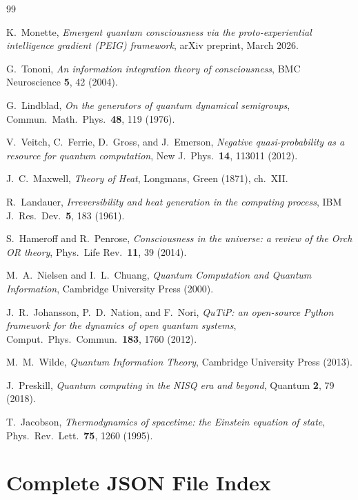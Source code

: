 \documentclass[12pt]{article}
\begin{document}
\begin{thebibliography}{99}

K.~Monette,
\textit{Emergent quantum consciousness via the proto-experiential intelligence
gradient (PEIG) framework},
arXiv preprint, March 2026.

G.~Tononi,
\textit{An information integration theory of consciousness},
BMC Neuroscience \textbf{5}, 42 (2004).

G.~Lindblad,
\textit{On the generators of quantum dynamical semigroups},
Commun.\ Math.\ Phys.\ \textbf{48}, 119 (1976).

V.~Veitch, C.~Ferrie, D.~Gross, and J.~Emerson,
\textit{Negative quasi-probability as a resource for quantum computation},
New J.\ Phys.\ \textbf{14}, 113011 (2012).

J.~C.~Maxwell,
\textit{Theory of Heat}, Longmans, Green (1871), ch.~XII.

R.~Landauer,
\textit{Irreversibility and heat generation in the computing process},
IBM J.\ Res.\ Dev.\ \textbf{5}, 183 (1961).

S.~Hameroff and R.~Penrose,
\textit{Consciousness in the universe: a review of the Orch OR theory},
Phys.\ Life Rev.\ \textbf{11}, 39 (2014).

M.~A.~Nielsen and I.~L.~Chuang,
\textit{Quantum Computation and Quantum Information},
Cambridge University Press (2000).

J.~R.~Johansson, P.~D.~Nation, and F.~Nori,
\textit{QuTiP: an open-source Python framework for the dynamics of open
quantum systems},
Comput.\ Phys.\ Commun.\ \textbf{183}, 1760 (2012).

M.~M.~Wilde,
\textit{Quantum Information Theory},
Cambridge University Press (2013).

J.~Preskill,
\textit{Quantum computing in the NISQ era and beyond},
Quantum \textbf{2}, 79 (2018).

T.~Jacobson,
\textit{Thermodynamics of spacetime: the Einstein equation of state},
Phys.\ Rev.\ Lett.\ \textbf{75}, 1260 (1995).

\end{thebibliography}

\appendix

\section{Complete JSON File Index}
\label{app:json}
\end{document}

